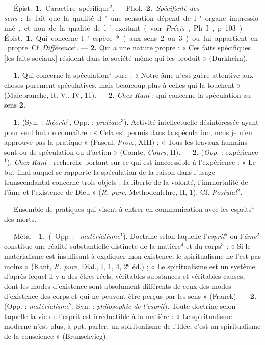 \begin{itemize}[leftmargin=1cm, label=, itemsep=1pt]
 — \si{Épist.} {\bf 1.} Caractère spécifique$^2$. — \si{Phol.}
{\bf 2.} {\it Spécificité des sens} : le fait que la qualité d’une sensation
dépend de l'organe impressionné, et non de la qualité de l’excitant (voir
{\it Précis}, Ph. I, p. 103).

 — \si{Épist.} {\bf 1.} Qui concerne l’espèce* (aux sens 2 ou
3) ou lui appartient en propre. Cf. {\it Différence}$^1$. — {\bf 2.} Qui a
une nature propre : « Ces faits spécifiques [les faits sociaux] résident dans
la société même qui les produit » (Durkheim).

 — {\bf 1.} Qui concerne la spéculation$^1$ pure : « Notre âme
n'est guère attentive aux choses purement spéculatives, mais beaucoup plus à
celles qui la touchent » (Malebranche, R. V., IV, 11). — {\bf 2.} {\it Chez
Kant} : qui concerne la spéculation au sens {\bf 2.}

 — {\bf 1.} (Syn. : {\it théorie}$^1$, Opp. :
{\it pratique}$^3$). Activité intellectuelle désintéressée ayant pour seul
but de connaître : « Cela est permis dans la spéculation, mais je n’en
approuve pas la pratique » (Pascal, {\it Prov.}, XIII) ; « Tous les travaux
humains sont ou de spéculation ou d'action » (Comte, {\it Cours}, II). —
{\bf 2.} ({\it Opp.} : expérience$^1$). {\it Chez Kant} : recherche portant
sur ce qui est inaccessible à l'expérience : « Le but final auquel se
rapporte la spéculation de la raison dans l’usage transcendantal concerne
trois objets : la liberté de la volonté, l’immortalité de l'âme et
l'existence de Dieu » ({\it R. pure}, Methodenlehre, II, 1). Cf.
{\it Postulat}$^2$.

 — Ensemble de pratiques qui visent à entrer en communication
avec les esprits$^4$ des morts.

 — \si{Méta.}  {\bf 1.} (Opp. : {\it
matérialisme}$^1$). Doctrine selon laquelle l'{\it esprit}$^5$ ou
l'{\it âme}$^2$ constitue une réalité substantielle distincte de la
matière$^4$ et du corps$^3$ : « Si le matérialisme est insuffisant à
expliquer mon existence, le spiritualisme ne l’est pas moins » (Kant,
{\it R. pure}, Dial., I, 1, 4, 2$^\text{e}$ éd.) ; « Le spiritualisme est un
système d’après lequel il y a des êtres réels, véritables substances et
véritables causes, dont les modes d’existence sont absolument différents de
ceux des modes d'existence des corps et qui ne peuvent être perçus par les
sens » (Franck). — {\bf 2.} (Opp. : {\it matérialisme}$^2$, Syn. : {\it
philosophie de l'esprit}). Toute doctrine selon laquelle la vie de l'esprit
est irréductible à la matière : « Le spiritualisme moderne n’est plus, à ppt.
parler, un spiritualisme de l’Idée, c’est un spiritualisme de la conscience
» (Brunschvicg).


\end{itemize}
